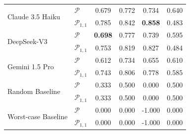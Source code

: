 {\begin{tabular}{llcccc}
\multirow{2}{*}{Claude 3.5 Haiku} & $\mathcal{P}$ & 0.679 & 0.772 & 0.734 & 0.640 \\
 & $\mathcal{P}_{1,1}$ & 0.785 & 0.842 & \textbf{0.858} & 0.483 \\
\multirow{2}{*}{DeepSeek-V3} & $\mathcal{P}$ & \textbf{0.698} & 0.777 & 0.739 & 0.595 \\
 & $\mathcal{P}_{1,1}$ & 0.753 & 0.819 & 0.827 & 0.484 \\
\multirow{2}{*}{Gemini 1.5 Pro} & $\mathcal{P}$ & 0.612 & 0.734 & 0.655 & 0.610 \\
 & $\mathcal{P}_{1,1}$ & 0.743 & 0.806 & 0.778 & 0.585 \\
\midrule
\multirow{2}{*}{Random Baseline} & $\mathcal{P}$ & 0.333 & 0.500 & 0.000 & 0.500 \\
 & $\mathcal{P}_{1,1}$ & 0.333 & 0.500 & 0.000 & 0.500 \\
\multirow{2}{*}{Worst-case Baseline} & $\mathcal{P}$ & 0.000 & 0.000 & -1.000 & 0.000 \\
 & $\mathcal{P}_{1,1}$ & 0.000 & 0.000 & -1.000 & 0.000 \\
\bottomrule
\end{tabular}
}